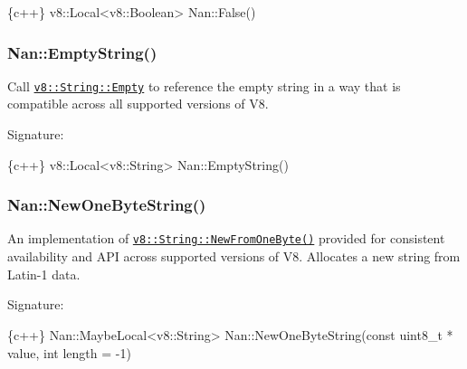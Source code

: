\begin{DoxyCode}
\{c++\}
v8::Local<v8::Boolean> Nan::False()
\end{DoxyCode}


\label{_api_nan_empty_string}%
 \subsubsection*{Nan\+::\+Empty\+String()}

Call \href{https://v8docs.nodesource.com/io.js-3.0/d2/db3/classv8_1_1_string.html#a7c1bc8886115d7ee46f1d571dd6ebc6d}{\tt {\ttfamily v8\+::\+String\+::\+Empty}} to reference the empty string in a way that is compatible across all supported versions of V8.

Signature\+:


\begin{DoxyCode}
\{c++\}
v8::Local<v8::String> Nan::EmptyString()
\end{DoxyCode}


\label{_api_nan_new_one_byte_string}%
 \subsubsection*{Nan\+::\+New\+One\+Byte\+String()}

An implementation of \href{https://v8docs.nodesource.com/io.js-3.0/d2/db3/classv8_1_1_string.html#a5264d50b96d2c896ce525a734dc10f09}{\tt {\ttfamily v8\+::\+String\+::\+New\+From\+One\+Byte()}} provided for consistent availability and A\+PI across supported versions of V8. Allocates a new string from Latin-\/1 data.

Signature\+:


\begin{DoxyCode}
\{c++\}
Nan::MaybeLocal<v8::String> Nan::NewOneByteString(const uint8\_t * value,
                                                  int length = -1)
\end{DoxyCode}
 